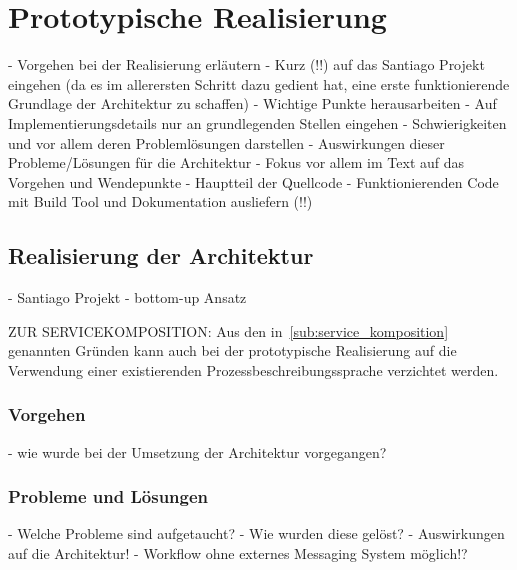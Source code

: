 
\chapter{Prototypische Realisierung} %
\label{cha:prototypische_realisierung}

- Vorgehen bei der Realisierung erläutern
- Kurz (!!) auf das Santiago Projekt eingehen (da es im allerersten Schritt dazu gedient hat, eine erste funktionierende Grundlage der Architektur zu schaffen)
- Wichtige Punkte herausarbeiten
- Auf Implementierungsdetails nur an grundlegenden Stellen eingehen
- Schwierigkeiten und vor allem deren Problemlösungen darstellen
- Auswirkungen dieser Probleme/Lösungen für die Architektur
- Fokus vor allem im Text auf das Vorgehen und Wendepunkte
- Hauptteil der Quellcode
- Funktionierenden Code mit Build Tool und Dokumentation ausliefern (!!)

\section{Realisierung der Architektur} %
\label{sec:realisierung_der_architektur}

  - Santiago Projekt
  - bottom-up Ansatz
  
  
  ZUR SERVICEKOMPOSITION: Aus den in~\ref{sub:service_komposition} genannten Gründen kann auch bei der prototypische Realisierung auf die Verwendung einer existierenden Prozessbeschreibungssprache verzichtet werden.
  
\subsection{Vorgehen} %
\label{sub:vorgehen_architektur}

  - wie wurde bei der Umsetzung der Architektur vorgegangen?

  
\subsection{Probleme und Lösungen} %
\label{sub:probleme_und_loesungen_architektur}

  - Welche Probleme sind aufgetaucht?
  - Wie wurden diese gelöst?
  - Auswirkungen auf die Architektur!
  - Workflow ohne externes Messaging System möglich!?


